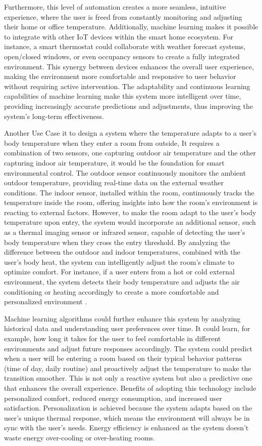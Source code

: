 \documentclass[a4paper]{scrartcl}
\begin{document}
Furthermore, this level of automation creates a more seamless, intuitive experience, where the user is freed from constantly monitoring and adjusting their home or office temperature.
Additionally, machine learning makes it possible to integrate with other IoT devices within the smart home ecosystem. For instance, a smart thermostat could collaborate with weather forecast systems, open/closed windows, or even occupancy sensors to create a fully integrated environment. This synergy between devices enhances the overall user experience, making the environment more comfortable and responsive to user behavior without requiring active intervention. The adaptability and continuous learning capabilities of machine learning make this system more intelligent over time, providing increasingly accurate predictions and adjustments, thus improving the system’s long-term effectiveness.

Another Use Case it to design a system where the temperature adapts to a user's body temperature when they enter a room from outside, It requires a combination of two sensors, one capturing outdoor air temperature and the other capturing indoor air temperature, it would be the foundation for smart environmental control. The outdoor sensor continuously monitors the ambient outdoor temperature, providing real-time data on the external weather conditions. The indoor sensor, installed within the room, continuously tracks the temperature inside the room, offering insights into how the room’s environment is reacting to external factors. However, to make the room adapt to the user’s body temperature upon entry, the system would incorporate an additional sensor, such as a thermal imaging sensor or infrared sensor, capable of detecting the user's body temperature when they cross the entry threshold. By analyzing the difference between the outdoor and indoor temperatures, combined with the user’s body heat, the system can intelligently adjust the room’s climate to optimize comfort. For instance, if a user enters from a hot or cold external environment, the system detects their body temperature and adjusts the air conditioning or heating accordingly to create a more comfortable and personalized environment \cite{r17}.

Machine learning algorithms could further enhance this system by analyzing historical data and understanding user preferences over time. It could learn, for example, how long it takes for the user to feel comfortable in different environments and adjust future responses accordingly. The system could predict when a user will be entering a room based on their typical behavior patterns (time of day, daily routine) and proactively adjust the temperature to make the transition smoother. This is not only a reactive system but also a predictive one that enhances the overall experience. Benefits of adopting this technology include personalized comfort, reduced energy consumption, and increased user satisfaction. Personalization is achieved because the system adapts based on the user’s unique thermal response, which means the environment will always be in sync with the user’s needs. Energy efficiency is enhanced as the system doesn’t waste energy over-cooling or over-heating rooms. 
\end{document}
